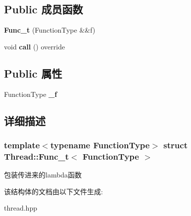 \subsection*{Public 成员函数}
\begin{DoxyCompactItemize}
\item 
\mbox{\label{structThread_1_1Func__t_af347c7e04169f92be6aff37d1d3d3a6b}} 
{\bfseries Func\+\_\+t} (Function\+Type \&\&f)
\item 
\mbox{\label{structThread_1_1Func__t_a2b6b3d0e5cd2889f589fec59782de255}} 
void {\bfseries call} () override
\end{DoxyCompactItemize}
\subsection*{Public 属性}
\begin{DoxyCompactItemize}
\item 
\mbox{\label{structThread_1_1Func__t_ab783414e8bbebf0e9ac0a7a5576be54c}} 
Function\+Type {\bfseries \+\_\+f}
\end{DoxyCompactItemize}


\subsection{详细描述}
\subsubsection*{template$<$typename Function\+Type$>$\newline
struct Thread\+::\+Func\+\_\+t$<$ Function\+Type $>$}

包装传进来的lambda函数 

该结构体的文档由以下文件生成\+:\begin{DoxyCompactItemize}
\item 
thread.\+hpp\end{DoxyCompactItemize}
